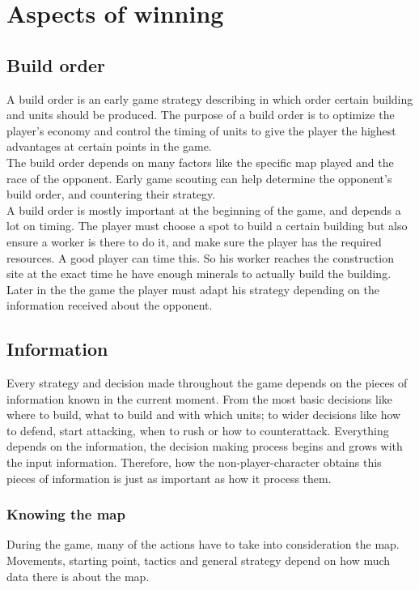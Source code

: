 \section{Aspects of winning}
	\subsection*{Build order}
		A build order is an early game strategy describing in which order certain building and units should be produced\cite{wiki_build_order}. 
		The purpose of a build order is to optimize the player's economy and control the timing of units to give 
		the player the highest advantages at certain points in the game.\\
		The build order depends on many factors like the specific map played and the race of the opponent. 
		Early game scouting can help determine the opponent's build order, and countering their strategy.\\
		
		A build order is mostly important at the beginning of the game, and depends a lot on timing. 
		The player must choose a spot to build a certain building but also ensure a worker is there to do it, 
		and make sure the player has the required resources. 
		A good player can time this. 
		So his worker reaches the construction site at the exact time he have enough minerals to actually build the building.\\
		
		Later in the the game the player must adapt his strategy depending on the information received about the opponent.
	
	\subsection*{Information}

		Every strategy and decision made throughout the game depends on the pieces of information 
		known in the current moment. From the most basic decisions like where to build, what to build and
		with which units; to wider decisions like how to defend, start attacking, when to rush or how to counterattack.
		Everything depends on the information, the decision making process begins and grows with the input information.
		Therefore, how the non-player-character obtains this pieces of information is just as important 
		as how it process them. 
	
			\subsubsection*{Knowing the map}
				During the game, many of the actions have to take into consideration the map. Movements, starting point, 
				tactics and general strategy depend on how much data there is about the map.  
				
